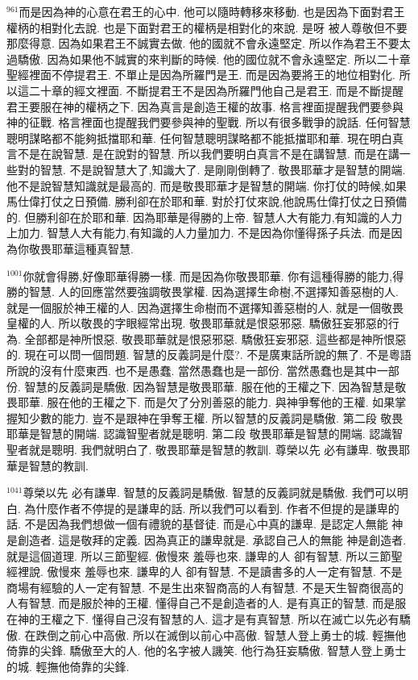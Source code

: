 \documentclass{book}
\begin{document}
$^{961}$而是因為神的心意在君王的心中.
他可以隨時轉移來移動.
也是因為下面對君王權柄的相對化去說.
也是下面對君王的權柄是相對化的來說.
是呀 被人尊敬但不要那麼得意.
因為如果君王不誠實去做.
他的國就不會永遠堅定.
所以作為君王不要太過驕傲.
因為如果他不誠實的來判斷的時候.
他的國位就不會永遠堅定.
所以二十章聖經裡面不停提君王.
不單止是因為所羅門是王.
而是因為要將王的地位相對化.
所以這二十章的經文裡面.
不斷提君王不是因為所羅門他自己是君王.
而是不斷提醒君王要服在神的權柄之下.
因為真言是創造王權的故事.
格言裡面提醒我們要參與神的征戰.
格言裡面也提醒我們要參與神的聖戰.
所以有很多戰爭的說話.
任何智慧聰明謀略都不能夠抵擋耶和華.
任何智慧聰明謀略都不能抵擋耶和華.
現在明白真言不是在說智慧.
是在說對的智慧.
所以我們要明白真言不是在講智慧.
而是在講一些對的智慧.
不是說智慧大了,知識大了.
是剛剛倒轉了.
敬畏耶華才是智慧的開端.
他不是說智慧知識就是最高的.
而是敬畏耶華才是智慧的開端.
你打仗的時候,如果馬仕偉打仗之日預備.
勝利卻在於耶和華.
對於打仗來說,他說馬仕偉打仗之日預備的.
但勝利卻在於耶和華.
因為耶華是得勝的上帝.
智慧人大有能力,有知識的人力上加力.
智慧人大有能力,有知識的人力量加力.
不是因為你懂得孫子兵法.
而是因為你敬畏耶華這種真智慧.

$^{1001}$你就會得勝,好像耶華得勝一樣.
而是因為你敬畏耶華.
你有這種得勝的能力,得勝的智慧.
人的回應當然要強調敬畏掌權.
因為選擇生命樹,不選擇知善惡樹的人.
就是一個服於神王權的人.
因為選擇生命樹而不選擇知善惡樹的人.
就是一個敬畏皇權的人.
所以敬畏的字眼經常出現.
敬畏耶華就是恨惡邪惡.
驕傲狂妄邪惡的行為.
全部都是神所恨惡.
敬畏耶華就是恨惡邪惡.
驕傲狂妄邪惡.
這些都是神所恨惡的.
現在可以問一個問題.
智慧的反義詞是什麼?.
不是廣東話所說的無了.
不是粵語所說的沒有什麼東西.
也不是愚蠢.
當然愚蠢也是一部份.
當然愚蠢也是其中一部份.
智慧的反義詞是驕傲.
因為智慧是敬畏耶華.
服在他的王權之下.
因為智慧是敬畏耶華.
服在他的王權之下.
而是欠了分別善惡的能力.
與神爭奪他的王權.
如果掌握知少數的能力.
豈不是跟神在爭奪王權.
所以智慧的反義詞是驕傲.
第二段 敬畏耶華是智慧的開端.
認識智聖者就是聰明.
第二段 敬畏耶華是智慧的開端.
認識智聖者就是聰明.
我們就明白了.
敬畏耶華是智慧的教訓.
尊榮以先 必有謙卑.
敬畏耶華是智慧的教訓.

$^{1041}$尊榮以先 必有謙卑.
智慧的反義詞是驕傲.
智慧的反義詞就是驕傲.
我們可以明白.
為什麼作者不停提的是謙卑的話.
所以我們可以看到.
作者不但提的是謙卑的話.
不是因為我們想做一個有禮貌的基督徒.
而是心中真的謙卑.
是認定人無能 神是創造者.
這是敬拜的定義.
因為真正的謙卑就是.
承認自己人的無能 神是創造者.
就是這個道理.
所以三節聖經.
傲慢來 羞辱也來.
謙卑的人 卻有智慧.
所以三節聖經裡說.
傲慢來 羞辱也來.
謙卑的人 卻有智慧.
不是讀書多的人一定有智慧.
不是商場有經驗的人一定有智慧.
不是生出來智商高的人有智慧.
不是天生智商很高的人有智慧.
而是服於神的王權.
懂得自己不是創造者的人.
是有真正的智慧.
而是服在神的王權之下.
懂得自己沒有智慧的人.
這才是有真智慧.
所以在滅亡以先必有驕傲.
在跌倒之前心中高傲.
所以在滅倒以前心中高傲.
智慧人登上勇士的城.
輕撫他倚靠的尖鋒.
驕傲至大的人.
他的名字被人譏笑.
他行為狂妄驕傲.
智慧人登上勇士的城.
輕撫他倚靠的尖鋒.
\end{document}

